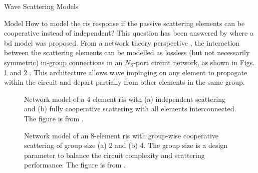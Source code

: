 \begin{section}{}
\begin{subsection}{Wave Scattering Models}
		\begin{subsubsection}{ Model}
			How to model the \gls{ris} response if the passive scattering elements can be cooperative instead of independent?
			This question has been answered by \cite{Shen2020a} where a \gls{bd} model was proposed.
			From a network theory perspective \cite{Ivrlac2010}, the interaction between the scattering elements can be modelled as lossless (but not necessarily symmetric) in-group connections in an $N_\mathrm{S}$-port circuit network, as shown in Figs. \ref{fg:bd_ris_architecture_1} and \ref{fg:bd_ris_architecture_2} \cite{Shen2020a}.
			This architecture allows wave impinging on any element to propagate within the circuit and depart partially from other elements in the same group.
			\begin{figure}[H]
				\centering
				\caption{Network model of a 4-element \gls{ris} with (a) independent scattering and (b) fully cooperative scattering with all elements interconnected. The figure is from \cite{Shen2020a}.}
				\label{fg:bd_ris_architecture_1}
			\end{figure}
			\begin{figure}[H]
				\centering
				\caption{Network model of an 8-element \gls{ris} with group-wise cooperative scattering of group size (a) 2 and (b) 4. The group size is a design parameter to balance the circuit complexity and scattering performance. The figure is from \cite{Shen2020a}.}
				\label{fg:bd_ris_architecture_2}
			\end{figure}


\end{subsubsection}
\end{subsection}
\end{section}
